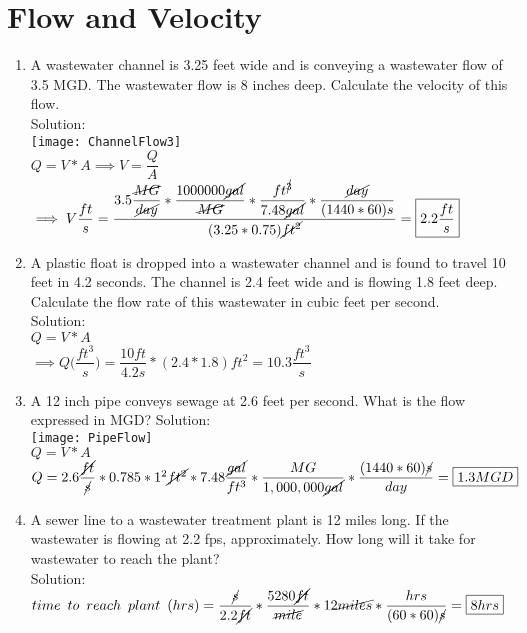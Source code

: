 \section{Flow and Velocity}
\begin{enumerate}
\item A wastewater channel is 3.25 feet wide and is conveying a wastewater flow of 3.5 MGD. The wastewater flow is 8 inches deep. Calculate the velocity of this flow.\\
Solution:\\
\texttt{[image: ChannelFlow3]}\\
$Q=V*A \implies V=\dfrac{Q}{A}$\\
$\implies V\dfrac{ft}{s}=\dfrac{3.5\dfrac{\cancel{MG}}{\cancel{day}}*\dfrac{1000000\cancel{gal}}{\cancel{MG}}*\dfrac{ft^{\cancel{3}}}{7.48\cancel{gal}}*\dfrac{\cancel{day}}{(1440*60)s}}{(3.25*0.75)\cancel{ft^2}}=\boxed{2.2\dfrac{ft}{s}}$

\item A plastic float is dropped into a wastewater channel and is found to travel 10 feet in 4.2 seconds. The channel is 2.4 feet wide and is flowing 1.8 feet deep. Calculate the flow rate of this wastewater in cubic feet per second.\\
Solution:\\
$Q=V*A$\\
$\implies Q\Big(\dfrac{ft^3}{s}\Big)=\dfrac{10ft}{4.2s}*(2.4*1.8)ft^2=\boxed{10.3\dfrac{ft^3}{s}}$
\item A 12 inch pipe conveys sewage at 2.6 feet per second.  What is the flow expressed in MGD?
Solution:\\
\texttt{[image: PipeFlow]}\\
$Q=V*A$\\
$Q=2.6\dfrac{\cancel{ft}}{\cancel{s}}*0.785*1^2\cancel{ft^2}*7.48\dfrac{\cancel{gal}}{ft^3}*\dfrac{MG}{1,000,000\cancel{gal}}*\dfrac{(1440*60)\cancel{s}}{day}=\boxed{1.3MGD}$\\

\item A sewer line to a wastewater treatment plant is 12 miles long. If the wastewater is flowing at 2.2 fps, approximately.  How long will it take for wastewater to reach the plant?\\
Solution:\\
$time \enspace to \enspace reach \enspace plant \enspace (hrs)=\dfrac{\cancel{s}}{2.2\cancel{ft}}*\dfrac{5280\cancel{ft}}{\cancel{mile}}*12\cancel{miles}*\dfrac{hrs}{(60*60)\cancel{s}}=\boxed{8hrs}$  
\end{enumerate}
